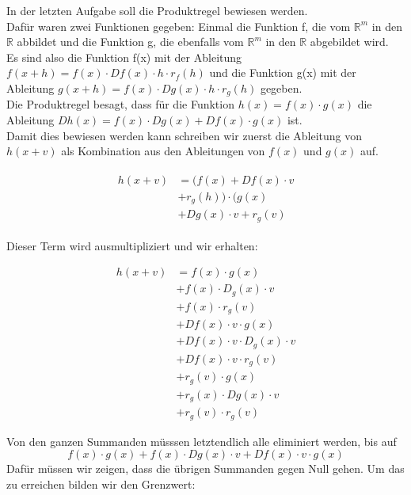 In der letzten Aufgabe soll die Produktregel bewiesen werden. \\
Dafür waren zwei Funktionen gegeben: Einmal die Funktion f, die vom $\mathds{R}^m$ in den $\mathds{R}$ abbildet und die Funktion g, die ebenfalls vom $\mathds{R}^m$ in den $\mathds{R}$ abgebildet wird. \\
Es sind also die Funktion f(x) mit der Ableitung $f(x+h) = f(x) \cdot Df(x) \cdot h \cdot r_{f}(h)$ und die Funktion g(x) mit der Ableitung $g(x+h) = f(x) \cdot Dg(x) \cdot h \cdot r_{g}(h)$ gegeben. \\
Die Produktregel besagt, dass für die Funktion $h(x) = f(x) \cdot g(x)$ die Ableitung $Dh(x) = f(x) \cdot Dg(x) + Df(x) \cdot g(x)$ %
 ist. \\
Damit dies bewiesen werden kann schreiben wir zuerst die Ableitung von $h(x+v)$ als Kombination aus den Ableitungen von $f(x)$ und $g(x)$ auf.

\begin{align} \begin{split} h(x+v) & = (f(x) + Df(x) \cdot v \\ & + r_{g}(h)) \cdot (g(x) \\ & + Dg(x) \cdot v + r_{g}(v) \end{split} \end{align}

Dieser Term wird ausmultipliziert und wir erhalten: 

\begin{equation}
\begin{split} h(x+v) & = f(x) \cdot g(x) \\ & + f(x)  \cdot D_{g}(x) \cdot v \\ & + f(x) \cdot r_{g}(v) \\ & + Df(x) \cdot v \cdot g(x) \\ & +  Df(x) \cdot v \cdot D_{g}(x) \cdot v  \\ & + Df(x) \cdot v \cdot r_{g}(v) \\ & +  r_{g}(v) \cdot g(x) \\ & + r_{g}(x) \cdot Dg(x) \cdot v \\ & + r_{g}(v) \cdot r_{g}(v) \end{split} \end{equation}   %

Von den ganzen Summanden müsssen letztendlich alle eliminiert werden, bis auf 
\begin{equation} f(x) \cdot g(x) + f(x) \cdot Dg(x) \cdot v + Df(x) \cdot v \cdot g(x) \end{equation} 
Dafür müssen wir zeigen, dass die übrigen Summanden gegen Null gehen. Um das zu erreichen bilden wir den Grenzwert:

